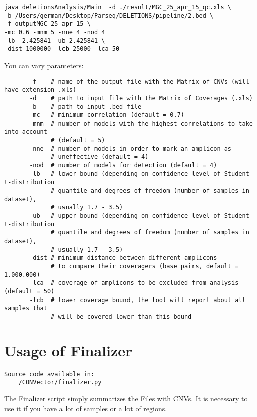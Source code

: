 \documentclass{article}
\begin{document}
\begin{lstlisting}[style=DOS, caption={An example of usage}]
java deletionsAnalysis/Main  -d ./result/MGC_25_apr_15_qc.xls \
-b /Users/german/Desktop/Parseq/DELETIONS/pipeline/2.bed \
-f outputMGC_25_apr_15 \
-mc 0.6 -mnm 5 -nne 4 -nod 4 
-lb -2.425841 -ub 2.425841 \ 
-dist 1000000 -lcb 25000 -lca 50 
\end{lstlisting}


You can vary parameters:
     
\begin{verbatim}
       -f    # name of the output file with the Matrix of CNVs (will have extension .xls)
       -d    # path to input file with the Matrix of Coverages (.xls)
       -b    # path to input .bed file
       -mc   # minimum correlation (default = 0.7)
       -mnm  # number of models with the highest correlations to take into account 
             # (default = 5)
       -nne  # number of models in order to mark an amplicon as 
             # uneffective (default = 4)
       -nod  # number of models for detection (default = 4)
       -lb   # lower bound (depending on confidence level of Student t-distribution 
             # quantile and degrees of freedom (number of samples in dataset), 
             # usually 1.7 - 3.5)
       -ub   # upper bound (depending on confidence level of Student t-distribution 
             # quantile and degrees of freedom (number of samples in dataset), 
             # usually 1.7 - 3.5)
       -dist # minimum distance between different amplicons 
             # to compare their coveragers (base pairs, default = 1.000.000)
       -lca  # coverage of amplicons to be excluded from analysis (default = 50)
       -lcb  # lower coverage bound, the tool will report about all samples that
             # will be covered lower than this bound
\end{verbatim}









\newpage
\section{Usage of Finalizer}
\begin{verbatim}
Source code available in:
    /CONVector/finalizer.py
\end{verbatim}

The Finalizer script simply summarizes the \hyperlink{fileWithCNVs}{Files with CNVs}. It is necessary to use it if you have a lot of samples or a lot of regions.
\end{document}
